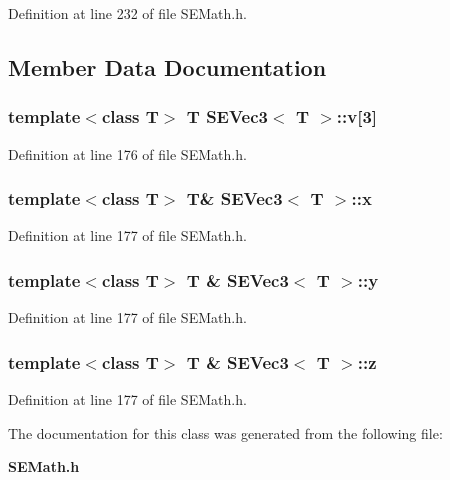 Definition at line 232 of file S\+E\+Math.\+h.



\subsection{Member Data Documentation}
\subsubsection[{v}]{\setlength{\rightskip}{0pt plus 5cm}template$<$class T$>$ T {\bf S\+E\+Vec3}$<$ T $>$\+::v[3]}\label{class_s_e_vec3_a702646d882656e6943d36aaa0d42ac3d}


Definition at line 176 of file S\+E\+Math.\+h.

\subsubsection[{x}]{\setlength{\rightskip}{0pt plus 5cm}template$<$class T$>$ T\& {\bf S\+E\+Vec3}$<$ T $>$\+::x}\label{class_s_e_vec3_aae38af83b62ddc1d3743007f51f4d4d6}


Definition at line 177 of file S\+E\+Math.\+h.

\subsubsection[{y}]{\setlength{\rightskip}{0pt plus 5cm}template$<$class T$>$ T \& {\bf S\+E\+Vec3}$<$ T $>$\+::y}\label{class_s_e_vec3_ac238f38eae683d2ac23f8ad7d7839528}


Definition at line 177 of file S\+E\+Math.\+h.

\subsubsection[{z}]{\setlength{\rightskip}{0pt plus 5cm}template$<$class T$>$ T \& {\bf S\+E\+Vec3}$<$ T $>$\+::z}\label{class_s_e_vec3_aa78daaf09f2ac405557615eb8ab89b13}


Definition at line 177 of file S\+E\+Math.\+h.



The documentation for this class was generated from the following file\+:\begin{DoxyCompactItemize}
\item 
{\bf S\+E\+Math.\+h}\end{DoxyCompactItemize}
